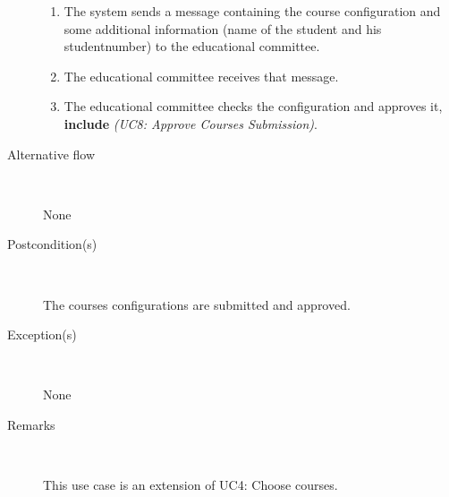 \begin{description}
\begin{enumerate}
	  	\item The system sends a message containing the course configuration and
	  	some additional information (name of the student and his studentnumber) to
	  	the educational committee.
	  	\item The educational committee receives that message.
	  	\item The educational committee checks the configuration and approves it,
	  	\textbf{include} \emph{(UC8: Approve Courses Submission)}.
	\end{enumerate}
	\item[Alternative flow] \
		\par None
	\item[Postcondition(s)] \ 
		\par The courses configurations are submitted and approved.
	\item[Exception(s)] \ 
		\par None
	\item[Remarks] \
		\par This use case is an extension of UC4: Choose courses.
\end{description}